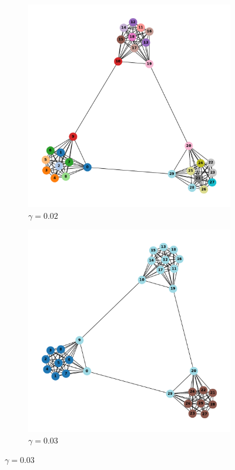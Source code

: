 \documentclass[10pt, letterpaper]{article}
\begin{document}
\begin{figure}[H]
  \begin{subfigure}{0.5\textwidth}
    \centering
    \includegraphics[width=0.8\linewidth]{gammachange3,10gamma=0.02.pdf}
    \caption{$\gamma = 0.02$}
    \label{g1}
  \end{subfigure}
  \begin{subfigure}{0.5\textwidth}
    \centering
    \includegraphics[width=0.8\linewidth]{gammachange3,10gamma=0.003.pdf}
    \caption{$\gamma = 0.03$}
    \label{g2}
  \end{subfigure}


\end{figure}
\end{document}
